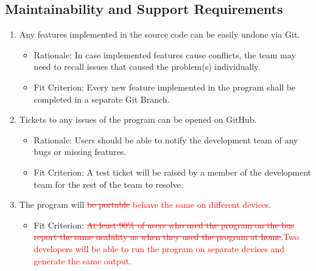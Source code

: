 \documentclass[12pt, titlepage]{article}
\begin{document}
\subsection{Maintainability and Support Requirements}
\begin{enumerate}[{MS}1. ]
\item \label{MS1} Any features implemented in the source code can be easily undone via Git.
    \begin{itemize} 
        \item Rationale: In case implemented features cause conflicts, the team may need to recall issues that caused the problem(s) individually.
        \item Fit Criterion: Every new feature implemented in the program shall be completed in a separate Git Branch.
    \end{itemize}
\item \label{MS2} Tickets to any issues of the program can be opened on GitHub.
    \begin{itemize} 
        \item Rationale: Users should be able to notify the development team of any bugs or missing features.
        \item Fit Criterion: A test ticket will be raised by a member of the development team for the rest of the team to resolve.
    \end{itemize}
\item \label{MS3} The program will \textcolor{red}{\sout{be portable} behave the same on different devices}.
    \begin{itemize} 
        \item Fit Criterion: \textcolor{red}{\sout{At least 90\% of users who used the program on the bus report the same usability as when they used the program at home}.Two developers will be able to run the program on separate devices and generate the same output.}
    \end{itemize}
\end{enumerate}
\end{document}
